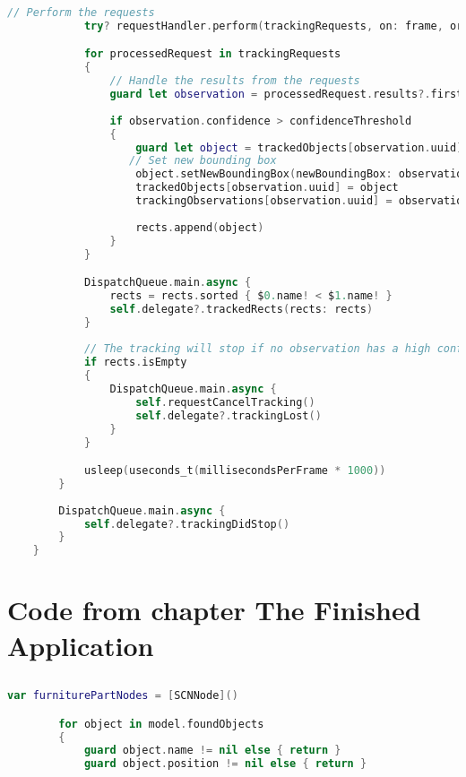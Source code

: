 \begin{appendices}
\begin{lstlisting}[language=swift]
		   // Perform the requests
            try? requestHandler.perform(trackingRequests, on: frame, orientation: CGImagePropertyOrientation.up)

            for processedRequest in trackingRequests
            {
                // Handle the results from the requests
                guard let observation = processedRequest.results?.first as? VNDetectedObjectObservation else { continue }
                
                if observation.confidence > confidenceThreshold
                {
                    guard let object = trackedObjects[observation.uuid] else { continue }
                   // Set new bounding box
                    object.setNewBoundingBox(newBoundingBox: observation.boundingBox, frame: boundingFrame)
                    trackedObjects[observation.uuid] = object
                    trackingObservations[observation.uuid] = observation
                    
                    rects.append(object)
                }
            }

            DispatchQueue.main.async {
                rects = rects.sorted { $0.name! < $1.name! }
                self.delegate?.trackedRects(rects: rects)
            }
            
            // The tracking will stop if no observation has a high confidence value
            if rects.isEmpty
            {
                DispatchQueue.main.async {
                    self.requestCancelTracking()
                    self.delegate?.trackingLost()
                }
            }

            usleep(useconds_t(millisecondsPerFrame * 1000))
        }
        
        DispatchQueue.main.async {
            self.delegate?.trackingDidStop()
        }
    }
\end{lstlisting}

\chapter{Code from  chapter The Finished Application}
\section{}

\begin{lstlisting}[language=swift]
    var furniturePartNodes = [SCNNode]()

        for object in model.foundObjects
        {
            guard object.name != nil else { return }
            guard object.position != nil else { return }
            

\end{lstlisting}
\end{appendices}
